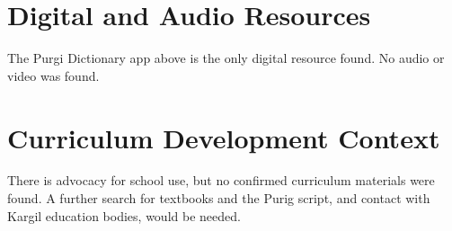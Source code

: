 \documentclass[12pt]{article}
\begin{document}
\section{Digital and Audio Resources}
The Purgi Dictionary app above is the only digital resource found. No audio or video was found.

\section{Curriculum Development Context}
There is advocacy for school use, but no confirmed curriculum materials were found. A further search for textbooks and the Purig script, and contact with Kargil education bodies, would be needed.
\end{document}
